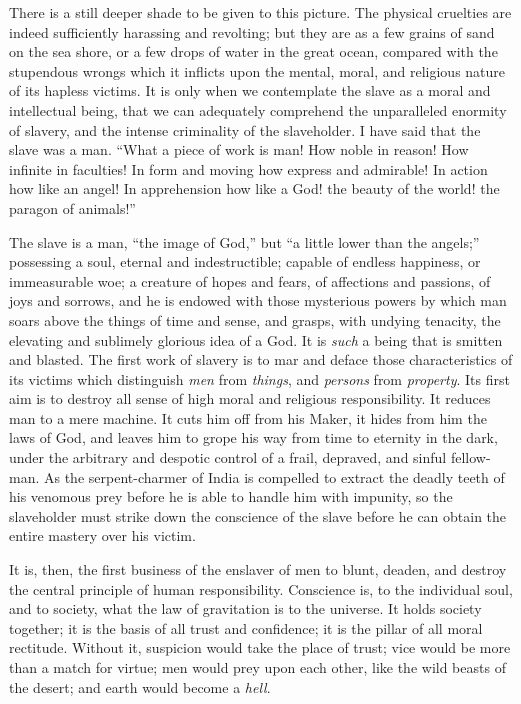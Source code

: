 There is a still deeper shade to be given to this picture. The physical
cruelties are indeed sufficiently harassing and revolting; but they are
as a few grains of sand on the sea shore, or a few drops of water in the
great ocean, compared with the stupendous wrongs which it inflicts upon
the mental, moral, and religious {\protect\hypertarget{431}{}{}}nature
of its hapless victims. It is only when we contemplate the slave as a
moral and intellectual being, that we can adequately comprehend the
unparalleled enormity of slavery, and the intense criminality of the
slaveholder. I have said that the slave was a man. ``What a piece of
work is man! How noble in reason! How infinite in faculties! In form and
moving how express and admirable! In action how like an angel! In
apprehension how like a God! the beauty of the world! the paragon of
animals!''

The slave is a man, ``the image of God,'' but ``a little lower than the
angels;'' possessing a soul, eternal and indestructible; capable of
endless happiness, or immeasurable woe; a creature of hopes and fears,
of affections and passions, of joys and sorrows, and he is endowed with
those mysterious powers by which man soars above the things of time and
sense, and grasps, with undying tenacity, the elevating and sublimely
glorious idea of a God. It is \emph{such} a being that is smitten and
blasted. The first work of slavery is to mar and deface those
characteristics of its victims which distinguish \emph{men} from
\emph{things}, and \emph{persons} from \emph{property}. Its first aim is
to destroy all sense of high moral and religious responsibility. It
reduces man to a mere machine. It cuts him off from his Maker, it hides
from him the laws of God, and leaves him to grope his way from time to
eternity in the dark, under the arbitrary and despotic control of a
frail, depraved, and sinful fellow-man. As the serpent-charmer of India
is compelled to extract the deadly teeth of his venomous prey before he
is able to handle him with impunity, so the slaveholder must strike down
the conscience of the slave before he can obtain the entire mastery over
his victim.

It is, then, the first business of the enslaver of men to blunt, deaden,
and destroy the central principle of human responsibility. Conscience
is, to the individual soul, and to society, what the law of gravitation
is to the universe. It holds society together; it is the basis of all
trust and confidence; it is the pillar of all moral rectitude. Without
it, suspicion would take the place of trust; vice would be more than a
match for virtue; men would prey upon each other, like the wild beasts
of the desert; and earth would become a \emph{hell}.

